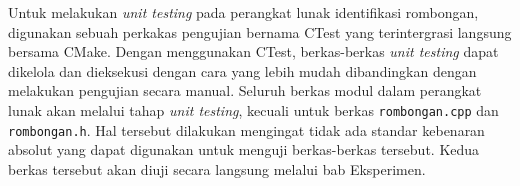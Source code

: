 Untuk melakukan \textit{unit testing} pada perangkat lunak identifikasi rombongan, digunakan sebuah perkakas pengujian bernama CTest yang terintergrasi langsung bersama CMake. Dengan menggunakan CTest, berkas-berkas \textit{unit testing} dapat dikelola dan dieksekusi dengan cara yang lebih mudah dibandingkan dengan melakukan pengujian secara manual. Seluruh berkas modul dalam perangkat lunak akan melalui tahap \textit{unit testing}, kecuali untuk berkas \texttt{rombongan.cpp} dan \texttt{rombongan.h}. Hal tersebut dilakukan mengingat tidak ada standar kebenaran absolut yang dapat digunakan untuk menguji berkas-berkas tersebut. Kedua berkas tersebut akan diuji secara langsung melalui bab Eksperimen.